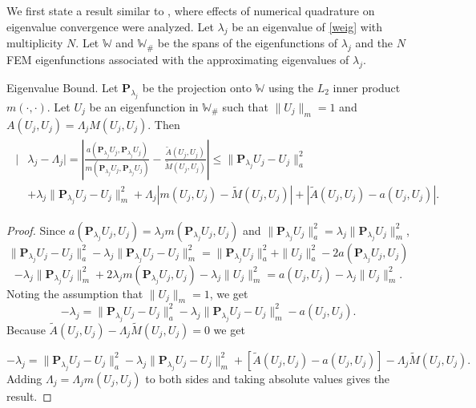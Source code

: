 \documentclass{siamart0516}
\newcommand{\W}{\mathbb{W}}
\newcommand{\bP}{\ensuremath{\boldsymbol P}}
\numberwithin{equation}{section}
\numberwithin{theorem}{section}
\numberwithin{figure}{section}
\begin{document}
We first state a result similar to \cite[Theorem 5.1]{BO90}, where effects of numerical quadrature on eigenvalue convergence were analyzed.  Let $\lambda_j$ be an eigenvalue of \eqref{weig} with multiplicity $N$.  Let $\W$ and $\W_\#$ be the spans of the eigenfunctions of $\lambda_j$ and the $N$ FEM eigenfunctions associated with the approximating eigenvalues of $\lambda_j$.
\begin{lemma}{Eigenvalue Bound.} \label{MacroBound}	
 Let $\bP_{\lambda_j}$ be the projection onto $\W$ using the $L_2$ inner product $m(\cdot,\cdot)$. Let $U_j$ be an eigenfunction in $\W_\#$ such that $\|U_j\|_m=1$ and $A(U_j,U_j) = \Lambda_jM(U_j,U_j)$. Then
\begin{align}
\label{eigbound}
\begin{aligned}
|& \lambda_j  - \Lambda_j| = \left|\frac{a(\bP_{\lambda_j}U_j,\bP_{\lambda_j}U_j)}{m(\bP_{\lambda_j}U_j,\bP_{\lambda_j}U_j)}- \frac{\widetilde{A}(U_j,U_j)}{\widetilde{M}(U_j,U_j)}\right|  \leq \|\bP_{\lambda_j}U_j-U_j\|_a^2  \\ & + \lambda_j\|\bP_{\lambda_j}U_j-U_j\|_m^2
+ \Lambda_j|m(U_j,U_j)-\widetilde{M}(U_j,U_j)| + |\widetilde{A}(U_j,U_j) - a(U_j,U_j)|.
\end{aligned}	
\end{align}
\end{lemma}
\begin{proof}
	Since $a(\bP_{\lambda_j}U_j,U_j) = \lambda_j m(\bP_{\lambda_j}U_j,U_j)$ and $\|\bP_{\lambda_j}U_j\|_a^2 = \lambda_j\|\bP_{\lambda_j}U_j\|_m^2$,
	$$
	\|\bP_{\lambda_j}U_j-U_j\|_a^2  - \lambda_j \|\bP_{\lambda_j}U_j-U_j\|_m^2 = \|\bP_{\lambda_j}U_j\|_a^2 + \|U_j\|_a^2 - 2a(\bP_{\lambda_j}U_j,U_j)
	$$
	$$
	 - \lambda_j\|\bP_{\lambda_j}U_j\|_m^2
	 + 2\lambda_jm(\bP_{\lambda_j}U_j,U_j) - \lambda_j\|U_j\|_m^2
    =
	a(U_j,U_j) - \lambda_j\|U_j\|_m^2.
	$$
	Noting the assumption that $\|U_j\|_m = 1$, we get
	\begin{equation}
		- \lambda_j = \|\bP_{\lambda_j}U_j-U_j\|_a^2 - \lambda_j\|\bP_{\lambda_j}U_j-U_j\|_m^2 - a(U_j,U_j). 
		\label{step1}
	\end{equation}
	Because $\widetilde{A}(U_j,U_j)-\Lambda_j\widetilde{M}(U_j,U_j)=0$ we get 
	
	$$
	- \lambda_j = \|\bP_{\lambda_j}U_j-U_j\|_a^2 - \lambda_j\|\bP_{\lambda_j}U_j-U_j\|_m^2  +[\widetilde{A}(U_j,U_j)- a(U_j,U_j)]  - \Lambda_j\widetilde{M}(U_j,U_j).
	$$
	Adding $\Lambda_j = \Lambda_jm(U_j,U_j)$ to both sides and taking absolute values gives the result.
\end{proof}
\end{document}
